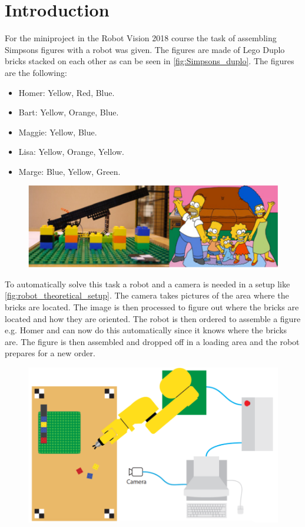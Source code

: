 \chapter{Introduction}
For the miniproject in the Robot Vision 2018 course the task of assembling Simpsons figures with a robot was given. The figures are made of Lego Duplo bricks stacked on each other as can be seen in \autoref{fig:Simpsons_duplo}. The figures are the following:

\begin{itemize}
\item Homer: Yellow, Red, Blue.
\item Bart: Yellow, Orange, Blue.
\item Maggie: Yellow, Blue.
\item Lisa: Yellow, Orange, Yellow.
\item Marge: Blue, Yellow, Green.
\end{itemize}

\begin{figure}[h]
\centering
\includegraphics[width=\textwidth]{figures/simpsons_duplo_figures.png}
\caption{}
\label{fig:Simpsons_duplo}
\end{figure}

To automatically solve this task a robot and a camera is needed in a setup like \autoref{fig:robot_theoretical_setup}. The camera takes pictures of the area where the bricks are located. The image is then processed to figure out where the bricks are located and how they are oriented. The robot is then ordered to assemble a figure e.g. Homer and can now do this automatically since it knows where the bricks are. The figure is then assembled and dropped off in a loading area and the robot prepares for a new order. 

\begin{figure}[h]
\centering
\includegraphics[width=\textwidth]{figures/robot_theoretical_setup.png}
\caption{}
\label{fig:robot_theoretical_setup}
\end{figure}